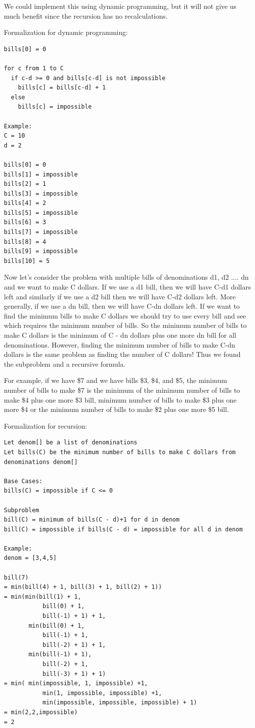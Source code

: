 \documentclass[11pt,oneside]{book}
\begin{document}
We could implement this using dynamic programming, but it will not give us much benefit since the recursion has no recalculations.

Formalization for dynamic programming:

\begin{lstlisting}
bills[0] = 0

for c from 1 to C
  if c-d >= 0 and bills[c-d] is not impossible
    bills[c] = bills[c-d] + 1
  else
    bills[c] = impossible

Example:
C = 10
d = 2

bills[0] = 0
bills[1] = impossible
bills[2] = 1
bills[3] = impossible
bills[4] = 2
bills[5] = impossible
bills[6] = 3
bills[7] = impossible
bills[8] = 4
bills[9] = impossible
bills[10] = 5
\end{lstlisting}

Now let's consider the problem with multiple bills of denominations d1, d2 .... dn and we want to make C dollars. If we use a d1 bill, then we will have C-d1 dollars left and similarly if we use a d2 bill then we will have C-d2 dollars left. More generally, if we use a dn bill, then we will have C-dn dollars left. If we want to find the minimum bills to make C dollars we should try to use every bill and see which requires the minimum number of bills. So the minimum number of bills to make C dollars is the minimum of C - dn dollars plus one more dn bill for all denominations. However, finding the minimum number of bills to make C-dn dollars is the same problem as finding the number of C dollars! Thus we found the subproblem and a recursive formula.

For example, if we have \$7 and we have bills \$3, \$4, and \$5, the minimum number of bills to make \$7 is the minimum of the minimum number of bills to make \$4 plus one more \$3 bill, minimum number of bills to make \$3 plus one more \$4 or the minimum number of bills to make \$2 plus one more \$5 bill.

Formalization for recursion:

\begin{lstlisting}
Let denom[] be a list of denominations
Let bills(C) be the minimum number of bills to make C dollars from denominations denom[]

Base Cases:
bills(C) = impossible if C <= 0

Subproblem
bill(C) = minimum of bills(C - d)+1 for d in denom
bill(C) = impossible if bills(C - d) = impossible for all d in denom

Example:
denom = [3,4,5]

bill(7)
= min(bill(4) + 1, bill(3) + 1, bill(2) + 1))
= min(min(bill(1) + 1,
           bill(0) + 1,
           bill(-1) + 1) + 1, 
       min(bill(0) + 1,
           bill(-1) + 1,
           bill(-2) + 1) + 1, 
       min(bill(-1) + 1),
           bill(-2) + 1,
           bill(-3) + 1) + 1)
= min( min(impossible, 1, impossible) +1,
           min(1, impossible, impossible) +1,
           min(impossible, impossible, impossible) + 1)
= min(2,2,impossible)
= 2
\end{lstlisting}
\end{document}
